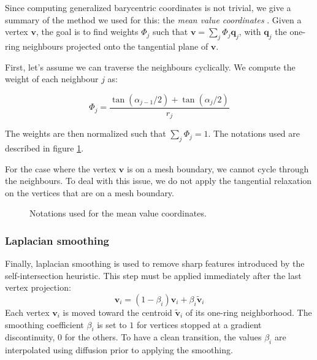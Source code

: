 \documentclass[a4paper,10pt]{article}
\begin{document}
\begin{multicols}{2}
Since computing generalized barycentric coordinates is not trivial, we give a summary of the method we used for this: the \emph{mean value coordinates} \cite{Hormann:2006}.
Given a vertex $\mathbf{v}$, the goal is to find weights $\Phi_j$ such that $\mathbf{v} = \sum_j \Phi_j \mathbf{q}_j$, with $\mathbf{q}_j$ the one-ring neighbours projected onto the tangential plane of $\mathbf{v}$.

First, let's assume we can traverse the neighbours cyclically.
We compute the weight of each neighbour $j$ as:

\begin{equation*}
\Phi_j = \frac{\tan(\alpha_{j-1} / 2) + \tan(\alpha_j / 2)}{r_j}
\end{equation*}

The weights are then normalized such that $\sum_j \Phi_j = 1$.
The notations used are described in figure \ref{fig:mvc}.

For the case where the vertex $\mathbf{v}$ is on a mesh boundary, we cannot cycle through the neighbours.
To deal with this issue, we do not apply the tangential relaxation on the vertices that are on a mesh boundary.

\begin{figure}[H]
\centering
{}
\caption{Notations used for the mean value coordinates.}
\label{fig:mvc}
\end{figure}


\subsubsection{Laplacian smoothing}

Finally, laplacian smoothing is used to remove sharp features introduced by the self-intersection heuristic.
This step must be applied immediately after the last vertex projection:
\begin{equation*}
\mathbf{v}_i = (1 - \beta_i) \mathbf{v}_i + \beta_i \tilde{\mathbf{v}}_i
\end{equation*}
Each vertex $\mathbf{v}_i$ is moved toward the centroid $\tilde{\mathbf{v}}_i$ of its one-ring neighborhood.
The smoothing coefficient $\beta_i$ is set to $1$ for vertices stopped at a gradient discontinuity, $0$ for the others.
To have a clean transition, the values $\beta_i$ are interpolated using diffusion prior to applying the smoothing.


\end{multicols}
\end{document}
